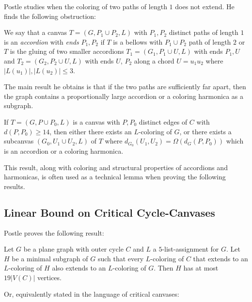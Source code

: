 Postle studies when the coloring of two paths of length $1$ does not extend. He finds the following obstruction:

\begin{definition}[Accordion]
	We say that a canvas $T = (G, P_1 \cup P_2, L)$ with $P_1, P_2$ distinct paths of length $1$ is an \emph{accordion} with \emph{ends} $P_1, P_2$ if $T$ is a bellows with $P_1 \cup P_2$ path of length $2$ or $T$ is the gluing of two smaller accordions $T_1 = (G_1, P_1 \cup U, L)$ with ends $P_1, U$ and $T_2 = (G_2, P_2 \cup U, L)$ with ends $U$, $P_2$ along a chord $U = u_1u_2$ where $|L(u_1)|, |L(u_2)| \leq 3$.
\end{definition}

The main result he obtains is that if the two paths are sufficiently far apart, then the graph contains a proportionally large accordion or a coloring harmonica as a subgraph.

\begin{theorem}
\label{bottlenecktheorem}
If $T = (G, P \cup P_0 , L)$ is a canvas with $P, P_0$ distinct edges of $C$ with $d(P, P_0) \geq 14$, then either there exists an $L$-coloring of $G$, or there exists a subcanvas $(G_0 , U_1 \cup U_2 , L)$ of $T$ where $d_{G_0} (U_1, U_2) = \Omega(d_G (P, P_0))$ which is an accordion or a coloring harmonica.
\end{theorem}

This result, along with coloring and structural properties of accordions and harmonicas, is often used as a technical lemma when proving the following results.

\subsection{Linear Bound on Critical Cycle-Canvases}

Postle proves the following result:

\begin{theorem}
\label{linearboundcycletheorem}
Let $G$ be a plane graph with outer cycle $C$ and $L$ a $5$-list-assignment for $G$. Let $H$ be a minimal subgraph of $G$ such that every $L$-coloring of $C$ that extends to an $L$-coloring of $H$ also extends to an $L$-coloring of $G$. Then $H$ has at most $19|V(C)|$ vertices.
\end{theorem}

Or, equivalently stated in the language of critical canvases:

